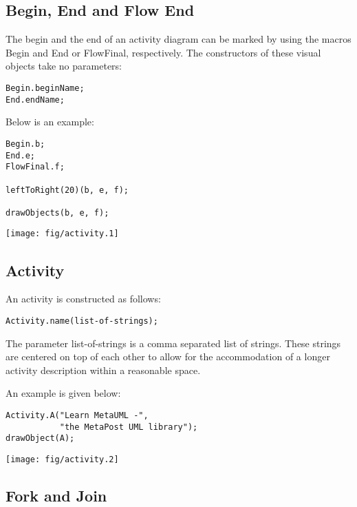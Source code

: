 \documentclass{article}
\newcommand{\code}{\ttfamily}
\begin{document}
\subsection{Begin, End and Flow End}

The begin and the end of an activity diagram can be marked by using the macros {\code Begin}
and {\code End} or {\code FlowFinal}, respectively. The constructors of these visual objects take no parameters:

\begin{verbatim}
Begin.beginName;
End.endName;
\end{verbatim}

Below is an example:

\begin{multicols}{2}
\begin{verbatim}
Begin.b;
End.e;
FlowFinal.f;

leftToRight(20)(b, e, f);

drawObjects(b, e, f);
\end{verbatim}
\columnbreak
\hspace{1cm}\texttt{[image: fig/activity.1]}
\end{multicols}

\subsection{Activity}

An activity is constructed as follows:
\begin{verbatim}
Activity.name(list-of-strings);
\end{verbatim}

The parameter {\code list-of-strings} is a comma separated list of strings. These strings are
centered on top of each other to allow for the accommodation of a longer activity description
within a reasonable space.

An example is given below:

\begin{multicols}{2}
\begin{verbatim}
Activity.A("Learn MetaUML -",
           "the MetaPost UML library");
drawObject(A);
\end{verbatim}
\columnbreak
\hspace{1cm}\texttt{[image: fig/activity.2]}
\end{multicols}

\subsection{Fork and Join}
\end{document}
